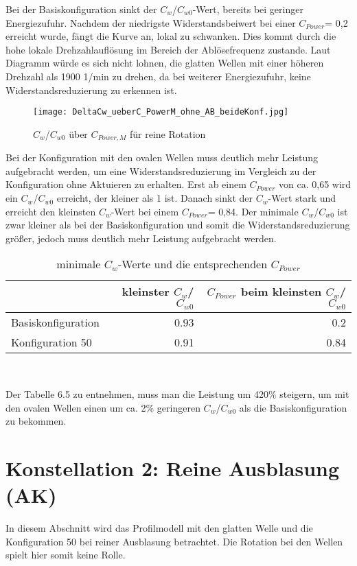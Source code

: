 Bei der Basiskonfiguration sinkt der $C_{w}$/$C_{w0}$-Wert, bereits bei geringer Energiezufuhr.  Nachdem der niedrigste Widerstandsbeiwert bei einer $C_{Power}$= 0,2 erreicht wurde, f\"angt die Kurve an, lokal zu schwanken. Dies kommt durch die hohe lokale Drehzahlaufl\"osung im Bereich der Abl\"osefrequenz zustande. Laut Diagramm w\"urde es sich nicht lohnen, die glatten Wellen mit einer h\"oheren Drehzahl als 1900  1/min zu drehen, da bei weiterer Energiezufuhr, keine Widerstandsreduzierung zu erkennen ist.
\begin{figure}[h]
	\centering
	\texttt{[image: DeltaCw\_ueberC\_PowerM\_ohne\_AB\_beideKonf.jpg]}
	\caption{ $C_{w}$/$C_{w0}$ \"uber $C_{Power,M}$ f\"ur reine Rotation  }
	\label{fig:Cw-Cw0-CpowerM_reine}
\end{figure}
Bei der Konfiguration mit den ovalen Wellen muss deutlich mehr Leistung aufgebracht werden, um eine Widerstandsreduzierung im Vergleich zu der Konfiguration ohne Aktuieren zu erhalten.  Erst ab einem $C_{Power}$ von ca. 0,65 wird ein $C_{w}$/$C_{w0}$ erreicht, der kleiner als 1 ist. 
Danach sinkt der $C_{w}$-Wert stark und erreicht den kleinsten $C_{w}$-Wert bei einem $C_{Power}$= 0,84. 
Der minimale $C_{w}$/$C_{w0}$ ist zwar kleiner als bei der Basiskonfiguration und somit die Widerstandsreduzierung gr\"o\ss{}er, jedoch muss deutlich mehr Leistung aufgebracht werden.
\begin{table}[h]
	\centering
	\begin{tabular}{lrr}
		\toprule
		 & kleinster  $C_{w}$/$C_{w0}$ & $C_{Power}$ beim kleinsten $C_{w}$/$C_{w0}$ \\
		\midrule
		Basiskonfiguration & 0.93 & 0.2\\
		Konfiguration 50 & 0.91 & 0.84\\
		\bottomrule
	\end{tabular}\\
	\caption{ minimale  $C_{w}$-Werte und die entsprechenden $C_{Power}$ }
	\label{tab:minimalCw-Cpower}
\end{table}
Der Tabelle 6.5 zu entnehmen, muss man die Leistung um 420\% steigern, um mit den ovalen Wellen einen um ca. 2\% geringeren $C_{w}$/$C_{w0}$ als die Basiskonfiguration zu bekommen.


\section{Konstellation 2: Reine Ausblasung (AK)}
\label{s:reineAusblasung}
In diesem Abschnitt wird das Profilmodell mit den glatten Welle und die Konfiguration 50 bei reiner Ausblasung betrachtet. Die Rotation bei den Wellen spielt hier somit keine Rolle. 

